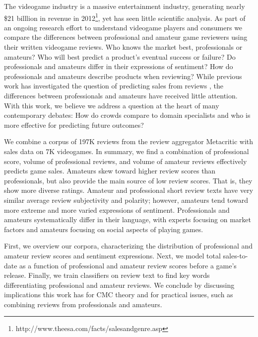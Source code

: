 \documentclass{sig-alternate}
\begin{document}
The videogame industry is a massive entertainment industry, generating nearly \$21 billlion in revenue in 2012\footnote{http://www.theesa.com/facts/salesandgenre.asp}, yet has seen little scientific analysis.
As part of an ongoing research effort to understand videogame players and consumers we compare the differences between professional and amateur game reviewers using their written videogame reviews. 
Who knows the market best, professionals or amateurs? Who will best predict a
product's eventual success or failure? Do professionals and amateurs
differ in their expressions of sentiment? How do professionals and
amateurs describe products when reviewing? While previous work has
investigated the question of predicting sales from reviews
\cite{chevalier2003effect, dellarocas2007exploring, duan2008online, forman2008examining, gruhl2005predictive, liu2001word, yu2012mining},
the differences between professionals and amateurs have received little
attention. With this work, we believe we address a question at the heart
of many contemporary debates: How do crowds compare to domain
specialists and who is more effective for predicting future outcomes?

We combine a corpus of 197K reviews from 
the review aggregator Metacritic with sales data on 7K videogames. In summary, we find a
combination of professional score, volume of professional reviews,
and volume of amateur reviews effectively predicts game sales. Amateurs
skew toward higher review scores than professionals, but also
provide the main source of low review scores. That is, they show more
diverse ratings. 
Amateur and professional short review texts have very similar 
average review subjectivity and polarity; however, amateurs tend toward
more extreme and more varied expressions of sentiment. 
Professionals and amateurs systematically differ in their language, with
experts focusing on market factors and amateurs focusing on
social aspects of playing games.

First, we overview our corpora, characterizing the
distribution of professional and amateur review scores and sentiment
expressions. Next, we model total sales-to-date as a function of 
professional and amateur review scores before a game's release. Finally,
we train classifiers on review text to find key words differentiating
professional and amateur reviews. We conclude by discussing
implications this work has for CMC theory and for practical
issues, such as combining reviews from professionals and amateurs.
\end{document}
